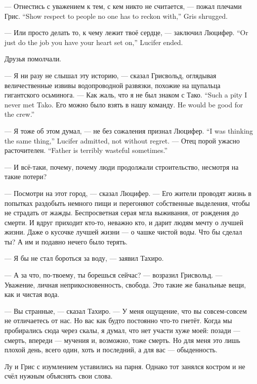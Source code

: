 {--- Отнестись с уважением к тем, с кем никто не считается, --- пожал плечами Грис.}
{``Show respect to people no one has to reckon with,'' Gris shrugged.}

{--- Или просто делать то, к чему лежит твоё сердце, --- заключил Люцифер.}
{``Or just do the job you have your heart set on,'' Lucifer ended.}

Друзья помолчали.

--- Я ни разу не слышал эту историю, --- сказал Грисвольд, оглядывая величественные извивы водопроводной развязки, похожие на щупальца гигантского осьминога.
{--- Как жаль, что я не был знаком с Тако.}
{``Such a pity I never met Tako.}
{Его можно было взять в нашу команду.}
{He would be good for the crew.''}

{--- Я тоже об этом думал, --- не без сожаления признал Люцифер.}
{``I was thinking the same thing,'' Lucifer admitted, not without regret.}
{--- Отец порой ужасно расточителен.}
{``Father is terribly wasteful sometimes.''}

--- И всё-таки, почему, почему люди продолжали строительство, несмотря на такие потери?

--- Посмотри на этот город, --- сказал Люцифер.
--- Его жители проводят жизнь в попытках раздобыть немного пищи и перегоняют собственные выделения, чтобы не страдать от жажды.
Беспросветная серая мгла выживания, от рождения до смерти.
И вдруг приходит кто-то, неважно кто, и дарит людям мечту о лучшей жизни.
Даже о кусочке лучшей жизни --- о чашке чистой воды.
Что бы сделал ты?
А им и подавно нечего было терять.

--- Я бы не стал бороться за воду, --- заявил Тахиро.

--- А за что, по-твоему, ты борешься сейчас? --- возразил Грисвольд.
--- Уважение, личная неприкосновенность, свобода.
Это такие же банальные вещи, как и чистая вода.

--- Вы странные, --- сказал Тахиро.
--- У меня ощущение, что вы совсем-совсем не отличаетесь от нас.
Но вас как будто постоянно что-то гнетёт.
Когда мы пробирались сюда через скалы, я думал, что нет участи хуже моей: позади --- смерть, впереди --- мучения и, возможно, тоже смерть.
Но для меня это лишь плохой день, всего один, хоть и последний, а для вас --- обыденность.

Лу и Грис с изумлением уставились на парня.
Однако тот занялся костром и не счёл нужным объяснять свои слова.

\asterism


